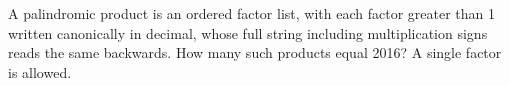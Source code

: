 A palindromic product is an ordered factor list, with each factor greater than 1 written canonically in decimal, whose full string including multiplication signs reads the same backwards. How many such products equal 2016? A single factor is allowed.
